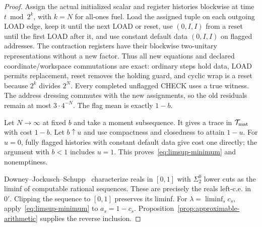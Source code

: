 \begin{proof}
Assign the actual initialized scalar and register histories blockwise at time $t\bmod2^k$, with $k=N$ for all-ones fuel. Load the assigned tuple on each outgoing LOAD edge, keep it until the next LOAD or reset, use $(0,I,I)$ from a reset until the first LOAD after it, and use constant default data $(0,I,I)$ on flagged addresses. The contraction registers have their blockwise two-unitary representations without a new factor. Thus all new equations and declared coordinate/workspace commutations are exact: ordinary steps hold data, LOAD permits replacement, reset removes the holding guard, and cyclic wrap is a reset because $2^k$ divides $2^N$. Every completed unflagged CHECK uses a true witness. The address dressing commutes with the new assignments, so the old residuals remain at most $3\cdot4^{-N}$. The flag mean is exactly $1-b$.

Let $N\to\infty$ at fixed $b$ and take a moment subsequence. It gives a trace in $\mathcal T_{\rm mat}$ with cost $1-b$. Let $b\uparrow u$ and use compactness and closedness to attain $1-u$. For $u=0$, fully flagged histories with constant default data give cost one directly; the argument with $b<1$ includes $u=1$. This proves~\eqref{eq:limsup-minimum} and nonemptiness.

Downey--Jockusch--Schupp~\cite[Theorem~5.1(ii)--(iii)]{DJS13} characterize reals in $[0,1]$ with $\Sigma^0_2$ lower cuts as the liminf of computable rational sequences. These are precisely the reals left-c.e. in $0'$. Clipping the sequence to $[0,1]$ preserves its liminf. For $\lambda=\liminf_s c_s$, apply~\eqref{eq:limsup-minimum} to $a_s=1-c_s$. Proposition~\ref{prop:approximable-arithmetic} supplies the reverse inclusion.
\end{proof}

